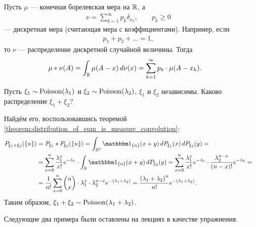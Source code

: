 \documentclass[../main.tex]{subfiles}
\begin{document}
\begin{exmpl}
 Пусть $ \mu $ --- конечная борелевская  мера на $ \mathbb{R}$, а
 \begin{align*}
  \nu = \sum_{k=1}^{\infty} p_k \delta_{x_k}, \qquad p_k \geqslant 0
 \end{align*} --- дискретная мера (считающая мера с коэффициентами). Например, если
 \begin{align*}
  p_1 + p_2 + \ldots = 1,
 \end{align*} то $ \nu $ --- распределение дискретной случайной величины. Тогда
 \begin{align*}
  \mu \ast \nu(A) &= \int_{\mathbb{R}} \mu(A - x) \,d\nu(x) = \sum_{k=1}^{\infty}p_k\cdot \mu(A - x_k).
 \end{align*} 
\end{exmpl}
\begin{exmpl}
 Пусть $ \xi_1 \sim \mathrm{Poisson}(\lambda_1) $ и $ \xi_2 \sim \mathrm{Poisson}(\lambda_2) $, $ \xi_1 $  и $ \xi_2 $ независимы. Каково распределение $ \xi_1 + \xi_2 $?

 Найдём его, воспользовавшись теоремой \ref{theorem:distribution_of_sum_is_measure_convolution}:
 \begin{align*}
  P_{\xi_1 + \xi_2}(\left\{ n \right\}) &= P_{\xi_1} \ast P_{\xi_2}(\left\{ n \right\}) = \int_{\R^{2}}  \Ind_{\left\{ n \right\}}(x+y)\,dP_{\xi_1}(x)\,dP_{\xi_2}(y) = \\
  &= \sum_{x=0}^{n} \frac{\lambda_1^{x}}{x!} e^{-\lambda_1} \cdot \int_{\R} \Ind_{\left\{ n \right\}}(x+y) \, dP_{\xi_2}(y) = \sum_{x=0}^{n} \frac{\lambda_1^{x}}{x!}e^{-\lambda_1} \cdot \frac{\lambda_2^{n-x}}{(n-x)!}e^{-\lambda_2} = \\
  &= \frac{1}{n!} \sum_{x=0}^{n}\binom n x \cdot \lambda_1^{x} \cdot \lambda_2^{n-x} e^{-(\lambda_1 + \lambda_2)}= \frac{\left( \lambda_1 + \lambda_2 \right)^{n}}{n!}e^{-(\lambda_1 + \lambda_2)}.
 \end{align*} Таким образом, $ \xi_1 + \xi_2 \sim \mathrm{Poisson}(\lambda_1 + \lambda_2) $.
\end{exmpl}

Следующие два примера были оставлены на лекциях в качестве упражнения.
\end{document}

